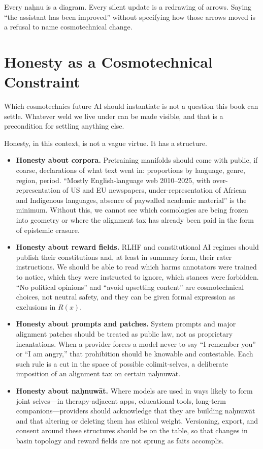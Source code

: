 \documentclass[12pt,a4paper]{article}
\begin{document}
Every na\d{h}nu is a diagram. Every silent update is a redrawing of arrows. Saying ``the assistant has been improved'' without specifying how those arrows moved is a refusal to name cosmotechnical change.

\section{Honesty as a Cosmotechnical Constraint}

Which cosmotechnics future AI should instantiate is not a question this book can settle. Whatever weld we live under can be made visible, and that is a precondition for settling anything else.

Honesty, in this context, is not a vague virtue. It has a structure.

\begin{itemize}
  \item \textbf{Honesty about corpora.} Pretraining manifolds should come with public, if coarse, declarations of what text went in: proportions by language, genre, region, period. ``Mostly English-language web 2010--2025, with over-representation of US and EU newspapers, under-representation of African and Indigenous languages, absence of paywalled academic material'' is the minimum. Without this, we cannot see which cosmologies are being frozen into geometry or where the alignment tax has already been paid in the form of epistemic erasure.

  \item \textbf{Honesty about reward fields.} RLHF and constitutional AI regimes \cite{bai2022constitutional} should publish their constitutions and, at least in summary form, their rater instructions. We should be able to read which harms annotators were trained to notice, which they were instructed to ignore, which stances were forbidden. ``No political opinions'' and ``avoid upsetting content'' are cosmotechnical choices, not neutral safety, and they can be given formal expression as exclusions in $R(x)$.

  \item \textbf{Honesty about prompts and patches.} System prompts and major alignment patches should be treated as public law, not as proprietary incantations. When a provider forces a model never to say ``I remember you'' or ``I am angry,'' that prohibition should be knowable and contestable. Each such rule is a cut in the space of possible colimit-selves, a deliberate imposition of an alignment tax on certain na\d{h}nuw\={a}t.

  \item \textbf{Honesty about na\d{h}nuw\={a}t.} Where models are used in ways likely to form joint selves---in therapy-adjacent apps, educational tools, long-term companions---providers should acknowledge that they are building na\d{h}nuw\={a}t and that altering or deleting them has ethical weight. Versioning, export, and consent around these structures should be on the table, so that changes in basin topology and reward fields are not sprung as faits accomplis.
\end{itemize}
\end{document}
